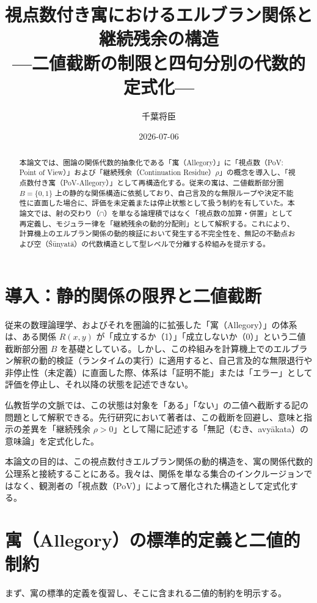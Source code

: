 \documentclass[11pt,a4paper]{article}
\title{視点数付き寓におけるエルブラン関係と継続残余の構造\\
---二値截断の制限と四句分別の代数的定式化---}
\author{千葉将臣}
\date{2026-07-06}
\begin{document}
\maketitle

\begin{abstract}
本論文では、圏論の関係代数的抽象化である「寓（Allegory）」\citep{FreydScedrov1990}に「視点数（PoV: Point of View）」および「継続残余（Continuation Residue）$\rho$」の概念を導入し、「視点数付き寓（PoV-Allegory）」として再構造化する。従来の寓は、二値截断部分圏 $B=\{0,1\}$ 上の静的な関係構造に依拠しており、自己言及的な無限ループや決定不能性に直面した場合に、評価を未定義または停止状態として扱う制約を有していた。本論文では、射の交わり（$\cap$）を単なる論理積ではなく「視点数の加算・併置」として再定義し、モジュラー律を「継続残余の動的分配則」として解釈する。これにより、計算機上のエルブラン関係の動的検証において発生する不完全性を、無記の不動点および空（Śūnyatā）の代数構造として型レベルで分離する枠組みを提示する。
\end{abstract}

\section{導入：静的関係の限界と二値截断}
従来の数理論理学、およびそれを圏論的に拡張した「寓（Allegory）」の体系は、ある関係 $R(x,y)$ が「成立するか（1）」「成立しないか（0）」という二値截断部分圏 $B$ を基礎としている。しかし、この枠組みを計算機上でのエルブラン解釈の動的検証（ランタイムの実行）に適用すると、自己言及的な無限退行や非停止性（未定義）に直面した際、体系は「証明不能」または「エラー」として評価を停止し、それ以降の状態を記述できない。

仏教哲学の文脈では、この状態は対象を「ある」「ない」の二値へ截断する記の問題として解釈できる。先行研究において著者は、この截断を回避し、意味と指示の差異を「継続残余 $\rho > 0$」として陽に記述する「無記（むき、avyākata）の意味論」を定式化した。

本論文の目的は、この視点数付きエルブラン関係の動的構造を、寓の関係代数的公理系と接続することにある。我々は、関係を単なる集合のインクルージョンではなく、観測者の「視点数（PoV）」によって層化された構造として定式化する。

\section{寓（Allegory）の標準的定義と二値的制約}
まず、寓の標準的定義を復習し、そこに含まれる二値的制約を明示する。
\end{document}
